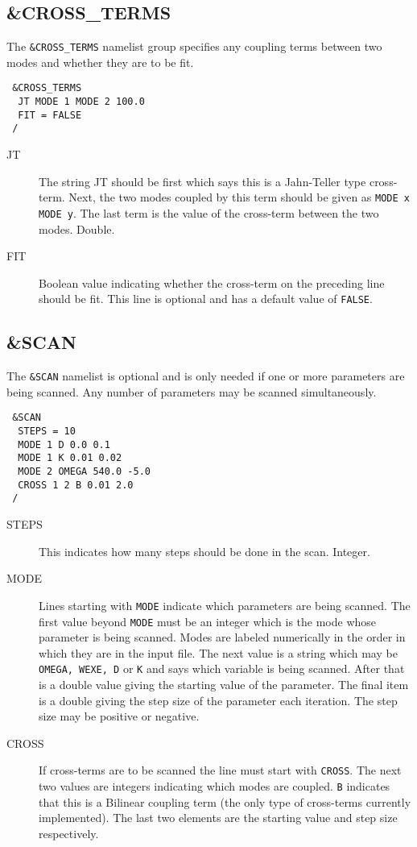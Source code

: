 \documentclass{article}
\begin{document}
\subsection{\&CROSS\_TERMS} The {\tt \&CROSS\_TERMS} namelist group specifies
any coupling terms between two modes and whether they are to be fit.

\begin{verbatim}
 &CROSS_TERMS
  JT MODE 1 MODE 2 100.0
  FIT = FALSE
 /
\end{verbatim}

\begin{description}
\item[JT] The string JT should be first which says this is a Jahn-Teller type cross-term.
Next, the two modes coupled by this term should be given as {\tt MODE x MODE y}. 
The last term is the value of the cross-term between the two modes. Double.

\item[FIT] Boolean value indicating whether the cross-term on the preceding line
should be fit. This line is optional and has a default value of {\tt FALSE}.

\end{description}

\subsection{\&SCAN} \label{scan}

The {\tt \&SCAN} namelist is optional and is only needed if one or more parameters
are being scanned. Any number of parameters may be scanned simultaneously.

\begin{verbatim}
 &SCAN
  STEPS = 10
  MODE 1 D 0.0 0.1
  MODE 1 K 0.01 0.02
  MODE 2 OMEGA 540.0 -5.0
  CROSS 1 2 B 0.01 2.0
 /
\end{verbatim}

\begin{description}
\item[STEPS] This indicates how many steps should be done in the scan.
Integer.

\item[MODE] Lines starting with {\tt MODE} indicate which parameters are being 
scanned. The first value beyond {\tt MODE} must be an integer which is the mode
whose parameter is being scanned. Modes are labeled numerically in the order
in which they are in the input file. The next value is a string which may be
{\tt OMEGA, WEXE, D} or {\tt K} and says which variable is being scanned. After that 
is a double value giving the starting value of the parameter. The final
item is a double giving the step size of the parameter each iteration. 
The step size may be positive or negative.

\item[CROSS] If cross-terms are to be scanned the line must start with 
{\tt CROSS}. The next two values are integers indicating which modes are coupled.
{\tt B} indicates that this is a Bilinear coupling term (the only type
of cross-terms currently implemented). The last two elements are the starting
value and step size respectively.

\end{description}
\end{document}

